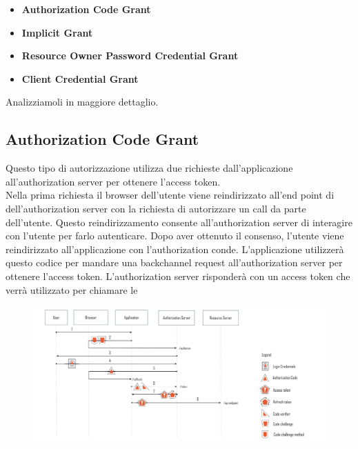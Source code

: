 \begin{itemize}
      \item \textbf{Authorization Code Grant}
      \item \textbf{Implicit Grant}
      \item \textbf{Resource Owner Password Credential Grant}
      \item \textbf{Client Credential Grant}
\end{itemize}

Analizziamoli in maggiore dettaglio.

\subsection{Authorization Code Grant}

Questo tipo di autorizzazione utilizza due richieste dall'applicazione all'authorization
server per ottenere l'access token.\\
Nella prima richiesta il browser dell'utente viene reindirizzato all'end point di
dell'authorization server con la richiesta di autorizzare un \api{} call da parte
dell'utente.
Questo reindirizzamento consente all'authorization server di interagire con l'utente
per farlo autenticare. Dopo aver ottenuto il consenso, l'utente viene reindirizzato
all'applicazione
con l'authorization conde. L'applicazione utilizzerà questo codice per mandare una
backchannel request all'authorization server per ottenere l'access token.
L'authorization server risponderà con un access token che verrà utilizzato per
chiamare le \api{}

\begin{figure}[H]
      \centering
      \includegraphics[width=\textwidth, keepaspectratio]{capitoli/id_managing/imgs/pkce.png}
\end{figure}

